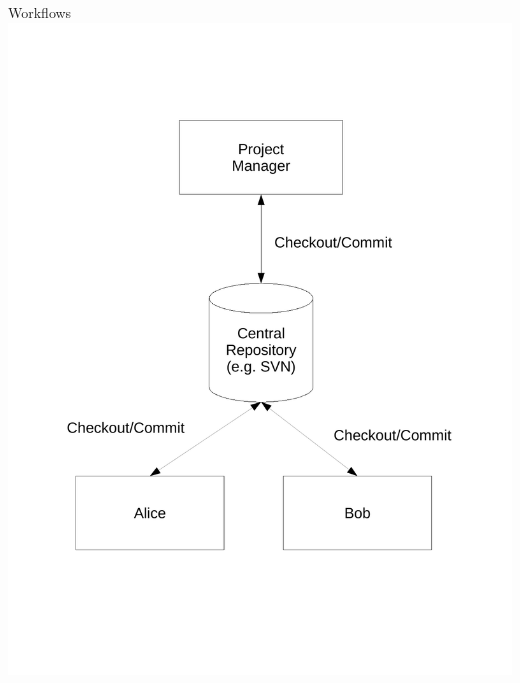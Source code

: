 \documentclass[final,hyperref={pdfpagelabels=false},notitlepage=true]{beamer}
\begin{document}
\begin{frame}{}
\begin{columns}[t]
\begin{column}{0.45\linewidth}
        \begin{block}{\large Workflows}
          \includegraphics[scale=1.00]{images/centralizedWorkflow.pdf}

\end{block}
\end{column}
\end{columns}
\end{frame}
\end{document}
